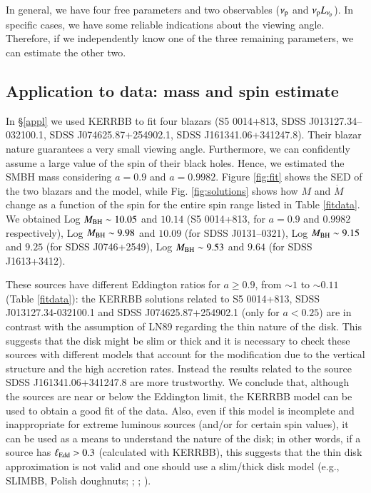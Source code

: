 \documentclass{aa}
\begin{document}
In general, we have four free parameters and two observables ($\nu_{\rm p}$ and $\nu_{\rm p} L_{\nu_{\rm p}}$). In specific cases, we have some reliable indications about the viewing angle. Therefore, if we independently know one of the three remaining parameters, we can estimate the other two.


\subsection{Application to data: mass and spin estimate}

In \S \ref{appl} we used KERRBB to fit four blazars (S5 0014+813, SDSS J013127.34--032100.1, SDSS J074625.87+254902.1, SDSS J161341.06+341247.8). Their blazar nature guarantees a very small viewing angle. Furthermore, we can confidently assume a large value of the spin of their black holes. Hence, we estimated the SMBH mass considering $a = 0.9$ and $a = 0.9982$. Figure \ref{fig:fit} shows the SED of the two blazars and the model, while Fig. \ref{fig:solutions} shows how $M$ and $\dot{M}$ change as a function of the spin for the entire spin range listed in Table \ref{fitdata}. We obtained Log $M_{\rm BH} \sim 10.05$ and $10.14$ (S5 0014+813, for $a=0.9$ and $0.9982$ respectively), Log $M_{\rm BH} \sim 9.98$ and $10.09$ (for SDSS J0131--0321), Log $M_{\rm BH} \sim 9.15$ and $9.25$ (for SDSS J0746+2549), Log $M_{\rm BH} \sim 9.53$ and $9.64$ (for SDSS J1613+3412). 

These sources have different Eddington ratios for $a \geq 0.9$, from $\sim 1$ to $\sim 0.11$ (Table \ref{fitdata}): the KERRBB solutions related to S5 0014+813, SDSS J013127.34-032100.1 and SDSS J074625.87+254902.1 (only for $a<0.25$) are in contrast with the assumption of LN89 regarding the thin nature of the disk. This suggests that the disk might be slim or thick and it is necessary to check these sources with different models that account for the modification due to the vertical structure and the high accretion rates. Instead the results related to the source SDSS J161341.06+341247.8 are more trustworthy. We conclude that, although the sources are near or below the Eddington limit, the KERRBB model can be used to obtain a good fit of the data. Also, even if this model is incomplete and inappropriate for extreme luminous sources (and/or for certain spin values), it can be used as a means to understand the nature of the disk; in other words, if a source has $\ell_{\rm Edd} > 0.3$ (calculated with KERRBB), this suggests that the thin disk approximation is not valid and one should use a slim/thick disk model (e.g., SLIMBB, Polish doughnuts; \citealt{SadwAbra}; \citealt{Straubetal}; \citealt{Wieletal}).
\end{document}
